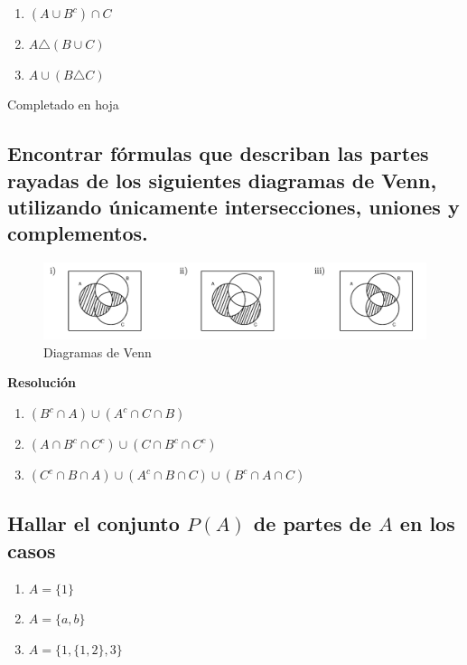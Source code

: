 \documentclass[11pt]{article}
\begin{document}
\begin{multicols}{3}
\begin{enumerate}[label=\roman*)]
    \item \((A \cup B^{c}) \cap C\)
    \item \(A \triangle (B \cup C)\)
    \item \(A \cup (B \triangle C)\)
\end{enumerate}
\end{multicols}

Completado en hoja

\subsection{Encontrar fórmulas que describan las partes rayadas de los siguientes diagramas de Venn, utilizando únicamente intersecciones, uniones y complementos.}
\begin{figure}[h!]
    \centering
    \includegraphics[width=1\textwidth]{image.png}
    \caption{Diagramas de Venn}
    \label{fig:venn}
\end{figure}

\textbf{Resolución}
\begin{enumerate}[label=\roman*)]
    \item \((B^{c} \cap A) \cup (A^{c} \cap C \cap B)\)
    \item \((A \cap B^{c} \cap C^{c}) \cup (C \cap B^{c} \cap C^{c})\) 
    \item \((C^{c} \cap B \cap A) \cup (A^{c} \cap B \cap C) \cup (B^{c} \cap A \cap C)\)
\end{enumerate}

\subsection{Hallar el conjunto \(P(A)\) de partes de \(A\) en los casos}
\begin{multicols}{3}
    \begin{enumerate}[label=\roman*)]
        \item \(A = \{1\}\)
        \item \( A = \{a, b\}\)
        \item \(A = \{1, \{1, 2\}, 3\}\)
    \end{enumerate}
\end{multicols}
\end{document}

